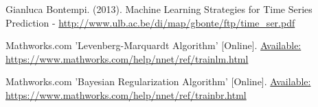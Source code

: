 \documentclass[conference]{IEEEtran}
\begin{document}
\begin{thebibliography}{3}

\justifying

\bibitem{}
{Gianluca Bontempi. (2013). Machine Learning Strategies for Time Series Prediction} - 
\url{http://www.ulb.ac.be/di/map/gbonte/ftp/time_ser.pdf}
 
\bibitem{}
{Mathworks.com 'Levenberg-Marquardt Algorithm' [Online].}
\url{Available: https://www.mathworks.com/help/nnet/ref/trainlm.html}

\bibitem{}
{Mathworks.com 'Bayesian Regularization Algorithm' [Online].}
\url{Available:  https://www.mathworks.com/help/nnet/ref/trainbr.html}

\end{thebibliography}

\begin{IEEEbiography}


\end{IEEEbiography}
\end{document}
